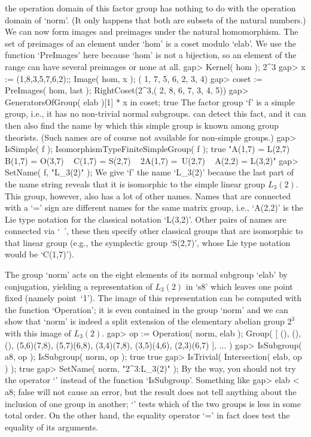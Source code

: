the operation domain  of this factor  group has  nothing  to do with  the
operation domain of `norm'. (It only happens that both are subsets of the
natural numbers.) We can now form  images and preimages under the natural
homomorphism. The set of  preimages of an element under  `hom' is a coset
modulo `elab'. We use the function  `PreImages' here because `hom' is not
a bijection, so an  element of the range can   have several preimages  or
none at all.
\beginexample
    gap> Kernel( hom );
    2^3
    gap> x := (1,8,3,5,7,6,2);; Image( hom, x );
    ( 1, 7, 5, 6, 2, 3, 4)
    gap> coset := PreImages( hom, last );
    RightCoset(2^3,( 2, 8, 6, 7, 3, 4, 5))
    gap> GeneratorsOfGroup( elab )[1] * x in coset;
    true
\endexample
The factor  group `f'  is  a simple  group,  i.e., it has  no non-trivial
normal subgroups. {\GAP} can detect this fact,  and it can then also find
the name by which this simple group is known among group theorists. (Such
names are of course not available for non-simple groups.)
\beginexample
    gap> IsSimple( f ); IsomorphismTypeFiniteSimpleGroup( f );
    true
    "A(1,7) = L(2,7) ~ B(1,7) = O(3,7) ~ C(1,7) = S(2,7) ~ 2A(1,7) =\
    U(2,7) ~ A(2,2) = L(3,2)"
    gap> SetName( f, "L_3(2)" );
\endexample
We give `f' the name  `L_3(2)' because the  last part of the name  string
reveals that  it is isomorphic to  the simple linear group $L_3(2)$. This
group, however, also has a  lot of other  names. Names that are connected
with a  `=' sign  are different names   for the same matrix group,  i.e.,
`A(2,2)' is the  Lie type notation for  the  classical notation `L(3,2)'.
Other pairs  of  names are  connected via `~',  these then  specify other
classical  groups  that are isomorphic  to that  linear  group (e.g., the
symplectic group `S(2,7)', whose Lie type notation would be `C(1,7)').

The group `norm' acts on the eight elements of its normal subgroup `elab'
by conjugation,  yielding  a representation   of $L_3(2)$ in   `s8' which
leaves one    point  fixed  (namely  point~`1').    The   image of   this
representation can be computed with the function  `Operation'; it is even
contained  in the group `norm' and  we can show  that `norm'  is indeed a
split extension of the elementary abelian group $2^3$  with this image of
$L_3(2)$.
\beginexample
    gap> op := Operation( norm, elab );
    Group( [ (), (), (), (5,6)(7,8), (5,7)(6,8), (3,4)(7,8), (3,5)(4,6), 
      (2,3)(6,7) ], ... )
    gap> IsSubgroup( a8, op ); IsSubgroup( norm, op );
    true
    true
    gap> IsTrivial( Intersection( elab, op ) );
    true
    gap> SetName( norm, "2^3:L_3(2)" );
\endexample
By the way, you should not try the operator `\<'  instead of the function
`IsSubgroup'. Something like
\beginexample
    gap> elab < a8;
    false
\endexample
will not cause an error, but the result does not  tell anything about the
inclusion of one group in another; `\<' tests  which of the two groups is
less in some total order. On the other hand, the equality operator `=' in
fact does test the equality of its arguments.

